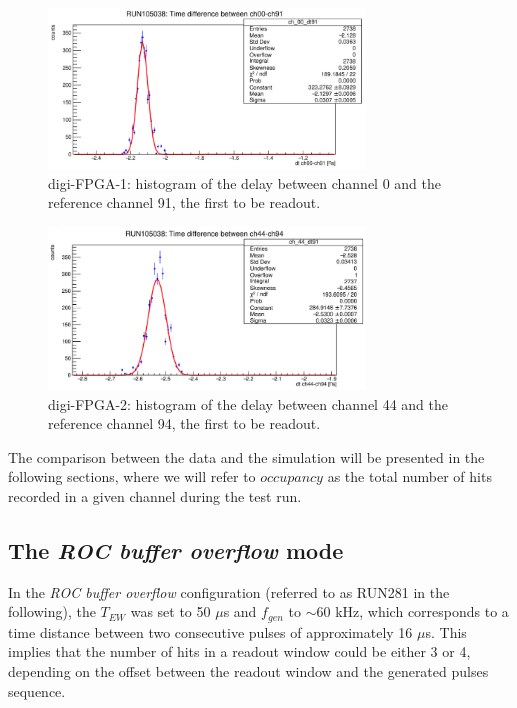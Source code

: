   \begin{figure}[!h]
          \centering
      \includegraphics[width=0.75\textwidth]{figures/png/Screenshot from 2023-12-03 11-50-50.png}
      \caption[Delay between channel 0 and the reference channel in digi-FPGA-1.]{digi-FPGA-1: histogram of the delay between 
      channel 0 and the reference channel 91, the first 
      to be readout.}
      \label{fig:delay1}
    \end{figure}
    \begin{figure}[!h]
          \centering
      \includegraphics[width=0.75\textwidth]{figures/png/Screenshot from 2023-12-03 11-50-33.png}
      \caption[Delay between channel 44 and the reference channel in digi-FPGA-2.]{digi-FPGA-2: histogram of the delay between 
      channel 44 and the reference channel 94, the first 
      to be readout.}
      \label{fig:delay2}
    \end{figure}
   
    The comparison between the data and the simulation 
    will be presented in the following sections, where 
    we will refer to $occupancy$ as the total number of hits 
    recorded in a given channel during the test run.
\subsection{The \textit{ROC buffer overflow} mode}
In the \textit{ROC buffer overflow} configuration (referred to 
as RUN281 in the following), 
the $T_{EW}$ was set to 50 $\mu$s and $f_{gen}$ to $\sim$60 kHz, 
which corresponds to 
a time distance between two consecutive pulses of 
approximately 16 $\mu$s.
This implies that the number of hits in a 
readout window could be 
either 3 or 4, depending on the offset 
between the readout window and the generated pulses sequence.
